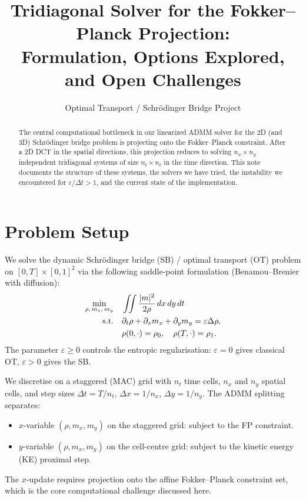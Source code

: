 \documentclass[11pt]{article}
\title{Tridiagonal Solver for the Fokker--Planck Projection:\\
       Formulation, Options Explored, and Open Challenges}
\author{Optimal Transport / Schr\"odinger Bridge Project}
\date{}
\newcommand{\eps}{\varepsilon}
\newcommand{\dt}{\Delta t}
\newcommand{\dx}{\Delta x}
\newcommand{\dy}{\Delta y}
\begin{document}
\maketitle

\begin{abstract}
The central computational bottleneck in our linearized ADMM solver for the 2D (and 3D)
Schr\"odinger bridge problem is projecting onto the Fokker--Planck constraint.
After a 2D DCT in the spatial directions, this projection reduces to solving
$n_x \times n_y$ independent tridiagonal systems of size $n_t \times n_t$ in the time direction.
This note documents the structure of these systems, the solvers we have tried, the
instability we encountered for $\eps/\dt > 1$, and the current state of the implementation.
\end{abstract}

\section{Problem Setup}

We solve the dynamic Schr\"odinger bridge (SB) / optimal transport (OT) problem on
$[0,T] \times [0,1]^2$ via the following saddle-point formulation (Benamou--Brenier with diffusion):
\begin{align}
  \min_{\rho,\, m_x,\, m_y} \quad & \iint \frac{|m|^2}{2\rho} \, dx\, dy\, dt \\
  \text{s.t.} \quad
  & \partial_t \rho + \partial_x m_x + \partial_y m_y = \eps \Delta \rho, \notag \\
  & \rho(0,\cdot) = \rho_0,\quad \rho(T,\cdot) = \rho_1. \notag
\end{align}
The parameter $\eps \geq 0$ controls the entropic regularisation: $\eps = 0$ gives
classical OT, $\eps > 0$ gives the SB.

We discretise on a staggered (MAC) grid with $n_t$ time cells, $n_x$ and $n_y$ spatial
cells, and step sizes $\dt = T/n_t$, $\dx = 1/n_x$, $\dy = 1/n_y$.
The ADMM splitting separates:
\begin{itemize}
  \item $x$-variable $(\rho, m_x, m_y)$ on the staggered grid: subject to the FP constraint.
  \item $y$-variable $(\rho, m_x, m_y)$ on the cell-centre grid: subject to the kinetic
        energy (KE) proximal step.
\end{itemize}
The $x$-update requires projection onto the affine Fokker--Planck constraint set, which
is the core computational challenge discussed here.
\end{document}
